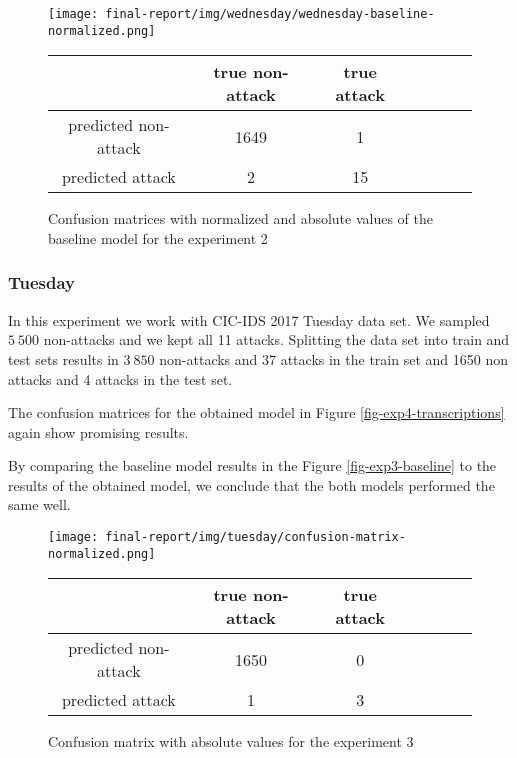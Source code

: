 \documentclass{article}
\begin{document}

\begin{figure}[h]
    \centering
    \texttt{[image: final-report/img/wednesday/wednesday-baseline-normalized.png]}

    \centering
    \begin{tabular}{ |c|c|c|c|c|c|c| }
     \hline
      & true non-attack & true attack \\
     \hline
     predicted non-attack & 1649 & 1 \\
     \hline
     predicted attack & 2 & 15 \\
     \hline
    \end{tabular}
    \caption{Confusion matrices with normalized and absolute values of the baseline model for the experiment 2}
    \label{fig-exp2-baseline}
\end{figure}


\clearpage

\subsubsection{Tuesday}
In this experiment we work with CIC-IDS 2017 Tuesday data set. We sampled $5\ 500$ non-attacks and we kept all 11 attacks. Splitting the data set into train and test sets results in $3\ 850$ non-attacks and 37 attacks in the train set and 1650 non attacks and 4 attacks in the test set.

The confusion matrices for the obtained model in Figure \ref{fig-exp4-transcriptions} again show promising results.

By comparing the baseline model results in the Figure \ref{fig-exp3-baseline} to the results of the obtained model, we conclude that the both models performed the same well.


\begin{figure}[h!]
    \centering
    \texttt{[image: final-report/img/tuesday/confusion-matrix-normalized.png]}

    \centering
    \begin{tabular}{ |c|c|c|c|c|c|c| }
     \hline
      & true non-attack & true attack \\
     \hline
     predicted non-attack & 1650 & 0 \\
     \hline
     predicted attack & 1 & 3 \\
     \hline
    \end{tabular}
    \caption{Confusion matrix with absolute values for the experiment 3}
    \label{fig-exp3-transcriptions}
\end{figure}
\end{document}
